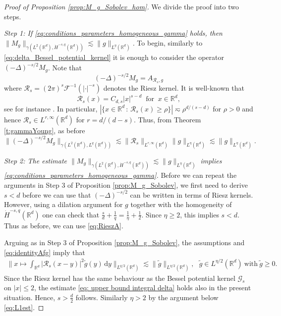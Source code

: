 \documentclass[reqno]{amsart}
\theoremstyle{plain}
\theoremstyle{remark}
\theoremstyle{plain}
\numberwithin{equation}{section}
\newcommand\cR{\mathscr{R}}
\def\R{{\mathbb R}}
\newcommand{\g}{\gamma}
\newcommand{\wt}{\widetilde}
\newcommand{\di}{\mathrm{d}}
\newcommand{\1}{\one}
\begin{document}
\begin{proof}[Proof of Proposition \ref{prop:M_g_Sobolev_hom}]
We divide the proof into two steps.

\smallskip

\emph{Step 1: If \eqref{eq:conditions_parameters_homogeneous_gamma} holds, then $\|M_g\|_{\g(L^2(\R^d),\dot{H}^{-s,q}(\R^d))}\lesssim \|g\|_{L^\eta(\R^d)}$.} 
To begin, similarly to \eqref{eq:delta_Bessel_potential_kernel} it is enough to consider the operator $(-\Delta)^{-s/2} M_g$. Note that 
\begin{equation}\label{eq:RieszA}
(-\Delta)^{-s/2} M_g= A_{\cR_s,g} 
\end{equation}
where $\cR_s=(2\pi)^{s}\mathscr{F}^{-1}(|\cdot|^{-s})$ denotes the Riesz kernel. It is well-known that
$$
\cR_s(x)= C_{d,s} |x|^{s-d} \ \text{ for }\  x\in \R^d,
$$
see for instance \cite[p.9]{Grafakos2}.
In particular, $|\{x\in \R^d\,:\, \cR_s(x)\geq \rho\}|\eqsim \rho^{d/(s-d)}$ for $\rho>0$ and hence  $\cR_s\in L^{r,\infty}(\R^d)$
for $r=d/(d-s)$. Thus, from Theorem \ref{t:gammaYoung}, as before
$$
\|(-\Delta)^{-s/2} M_g\|_{\g(L^2(\R^d),L^q(\R^d))}
\lesssim \|\cR_s\|_{L^{r,\infty}(\R^d)}\|g\|_{L^\eta(\R^d)}
\lesssim \|g\|_{L^\eta(\R^d)}.
$$

\emph{Step 2: The estimate $\|M_g\|_{\g(L^2(\R^d),\dot{H}^{-s,q}(\R^d))}\lesssim \|g\|_{L^\eta(\R^d)}$ implies \eqref{eq:conditions_parameters_homogeneous_gamma}.}
%
Before we can repeat the arguments in Step 3 of Proposition \ref{prop:M_g_Sobolev}, we first need to derive $s<d$ before we can use that $(-\Delta)^{-s/2}$ can be written in terms of Riesz kernels. However, using a dilation argument for $g$ together with the homogeneity of $\dot{H}^{-s,q}(\R^d)$ one can check that $
\frac{s}{d}+\frac{1}{q}= \frac{1}{\eta}+\frac{1}{2}$. Since $\eta\geq 2$, this implies $s<d$. Thus as before, we can use \eqref{eq:RieszA}.


Arguing as in Step 3 of Proposition \ref{prop:M_g_Sobolev}, the assumptions and \eqref{eq:identityAfg} imply that
\begin{align}
\label{eq: cond tilde g Riesz}
\Big\|x\mapsto \int_{\R^d} |\cR_s(x-y)|^2  \wt{g}(y)\,\di y\Big\|_{L^{q/2}(\R^d)} 
 \lesssim \|\wt{ g}\|_{L^{\eta/2}(\R^d)}, \ \ \ \wt{g}\in L^{\eta/2}(\R^d) \ \text{with} \ \wt{g}\geq 0. 
 \end{align}
 Since the Riesz kernel has the same behaviour as the Bessel potential kernel $\mathcal{G}_s$ on $|x|\leq 2$, the estimate \eqref{eq: upper bound integral delta} holds also in the present situation. Hence, $s>\frac{d}{2}$ follows. Similarly $\eta>2$ by the argument below \eqref{eq:L1est}.
\end{proof}
\end{document}
